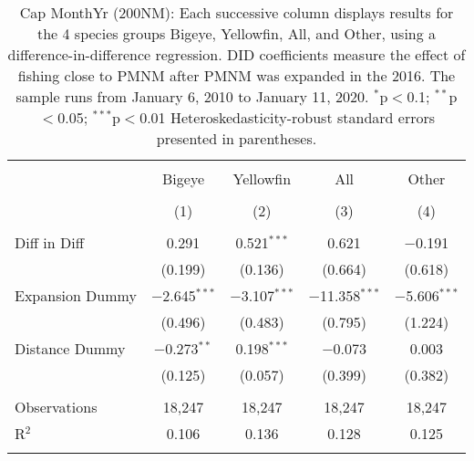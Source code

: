 
\begin{table}[!htbp] \centering 
  \caption{Cap MonthYr (200NM): Each successive column displays results for the 4 species groups Bigeye, Yellowfin, All, and Other, using a difference-in-difference regression. DID coefficients measure the effect of fishing close to PMNM after PMNM was expanded in the 2016. The sample runs from January 6, 2010 to January 11, 2020. $^{*}$p$<$0.1; $^{**}$p$<$0.05; $^{***}$p$<$0.01 Heteroskedasticity-robust standard errors presented in parentheses.} 
  \label{tbl:timeFE200NM} 
\begin{tabular}{@{\extracolsep{5pt}}lcccc} 
\\[-1.8ex]\hline 
\hline \\[-1.8ex] 
 & Bigeye & Yellowfin & All & Other \\ 
\\[-1.8ex] & (1) & (2) & (3) & (4)\\ 
\hline \\[-1.8ex] 
 Diff in Diff & 0.291 & 0.521$^{***}$ & 0.621 & $-$0.191 \\ 
  & (0.199) & (0.136) & (0.664) & (0.618) \\ 
  Expansion Dummy & $-$2.645$^{***}$ & $-$3.107$^{***}$ & $-$11.358$^{***}$ & $-$5.606$^{***}$ \\ 
  & (0.496) & (0.483) & (0.795) & (1.224) \\ 
  Distance Dummy & $-$0.273$^{**}$ & 0.198$^{***}$ & $-$0.073 & 0.003 \\ 
  & (0.125) & (0.057) & (0.399) & (0.382) \\ 
 \hline \\[-1.8ex] 
Observations & 18,247 & 18,247 & 18,247 & 18,247 \\ 
R$^{2}$ & 0.106 & 0.136 & 0.128 & 0.125 \\ 
\hline 
\hline \\[-1.8ex] 
\end{tabular} 
\end{table} 
